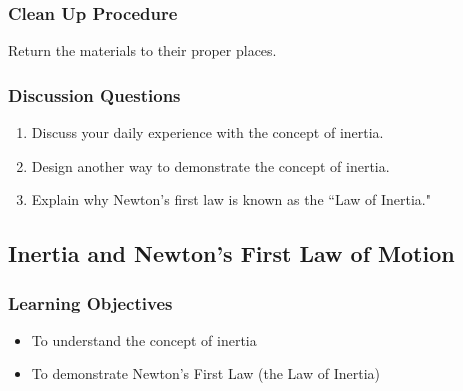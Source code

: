 \subsubsection*{Clean Up Procedure}
Return the materials to their proper places.

\subsubsection*{Discussion Questions}
\begin{enumerate}
\item{Discuss your daily experience with the concept of inertia.} 
\item{Design another way to demonstrate the concept of inertia.} 
\item{Explain why Newton's first law is known as the ``Law of Inertia."}
\end{enumerate}




\subsection{Inertia and Newton's First Law of Motion}

\subsubsection*{Learning Objectives}
\begin{itemize}
\item{To understand the concept of inertia} 
\item{To demonstrate Newton's First Law (the Law of Inertia)} 
\end{itemize}

